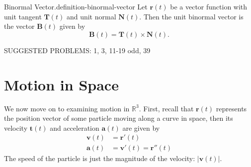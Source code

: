 \documentclass[10pt,]{book}
\numberwithin{equation}{section}
\newcommand{\RR}{\mathbb{R}}
\newcommand{\vv}[1]{\mathbf{#1}}
\begin{document}
\begin{definition}{Binormal Vector.}{definition-binormal-vector}%
\hypertarget{p-1305}{}%
Let \(\vv{r}(t)\) be a vector function with unit tangent \(\vv{T}(t)\) and unit normal \(\vv{N}(t)\). Then the unit binormal vector is the vector \(\vv{B}(t)\) given by%
%
\begin{equation*}
\vv{B}(t) = \vv{T}(t)\times\vv{N}(t).
\end{equation*}
\end{definition}
\hypertarget{p-1306}{}%
SUGGESTED PROBLEMS: 1, 3, 11-19 odd, 39%
%
%
\typeout{************************************************}
\typeout{************************************************}
%
\section[{Motion in Space}]{Motion in Space}\label{section-motion-in-space}
\hypertarget{p-1307}{}%
We now move on to examining motion in \(\RR^{3}\). First, recall that \(\vv{r}(t)\) represents the position vector of some particle moving along a curve in space, then its velocity \(\vv{t}(t)\) and acceleration \(\vv{a}(t)\) are given by%
%
\begin{align*}
\vv{v}(t) & = \vv{r}'(t) \\
\vv{a}(t) & = \vv{v}'(t) = \vv{r}''(t) 
\end{align*}
\hypertarget{p-1308}{}%
The speed of the particle is just the magnitude of the velocity: \(|\vv{v}(t)|\).%
\end{document}

